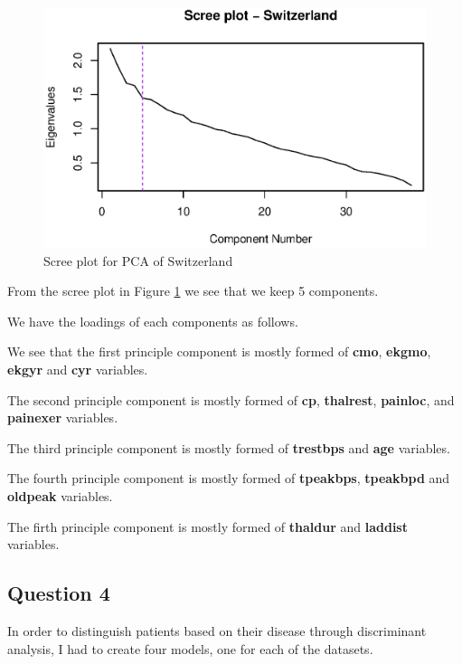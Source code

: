 \documentclass[a4paper]{article}
\begin{document}
\begin{figure}[H]
	\begin{center}
		\includegraphics[width=12cm]{question3output/swiscreeplot.eps}
	\end{center}
	\caption{Scree plot for PCA of Switzerland}
	\label{q3-swi-screeplot}
\end{figure}

From the scree plot in Figure \ref{q3-swi-screeplot} we see that we keep 5 components.

We have the loadings of each components as follows.



We see that the first principle component is mostly formed of \textbf{cmo}, \textbf{ekgmo}, \textbf{ekgyr} and \textbf{cyr} variables.

The second principle component is mostly formed of \textbf{cp}, \textbf{thalrest}, \textbf{painloc}, and \textbf{painexer} variables.

The third principle component is mostly formed of \textbf{trestbps} and \textbf{age} variables.

The fourth principle component is mostly formed of \textbf{tpeakbps}, \textbf{tpeakbpd} and \textbf{oldpeak} variables.

The firth principle component is mostly formed of \textbf{thaldur} and \textbf{laddist} variables.

\newpage
\subsection{Question 4}

In order to distinguish patients based on their disease through discriminant
analysis, I had to create four models, one for each of the datasets.
\end{document}
